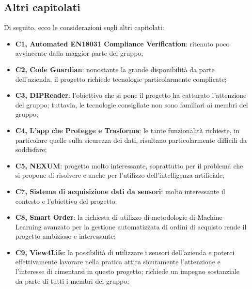 \documentclass[a4paper,10pt]{article}
\begin{document}
\subsection*{Altri capitolati}
Di seguito, ecco le considerazioni sugli altri capitolati:
\begin{itemize}
    \item \textbf{C1, Automated EN18031 Compliance Verification}: ritenuto poco avvincente dalla maggior parte del gruppo;
    \item \textbf{C2, Code Guardian}: nonostante la grande disponibilità da parte dell'azienda, il progetto richiede tecnologie particolarmente complicate;
    \item \textbf{C3, DIPReader}: l'obiettivo che si pone il progetto ha catturato l'attenzione del gruppo; tuttavia, le tecnologie consigliate non sono familiari ai membri del gruppo;
    \item \textbf{C4, L'app che Protegge e Trasforma}: le tante funzionalità richieste, in particolare quelle sulla sicurezza dei dati, risultano particolarmente difficili da soddisfare;
    \item \textbf{C5, NEXUM}: progetto molto interessante, soprattutto per il problema che si propone di risolvere e anche per l'utilizzo dell'intelligenza artificiale;
    \item \textbf{C7, Sistema di acquisizione dati da sensori}: molto interessante il contesto e l'obiettivo del progetto;
    \item \textbf{C8, Smart Order}: la richiesta di utilizzo di metodologie di Machine Learning avanzato per la gestione automatizzata di ordini di acquisto rende il progetto ambizioso e interessante;
    \item \textbf{C9, View4Life}: la possibilità di utilizzare i sensori dell'azienda e poterci effettivamente lavorare nella pratica attira sicuramente l'attenzione e l'interesse di cimentarsi in questo progetto; richiede un impegno sostanziale da parte di tutti i membri del gruppo;
\end{itemize}
\end{document}
